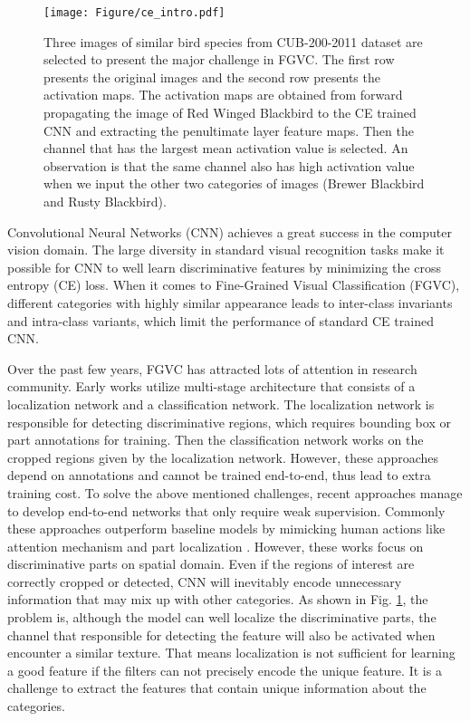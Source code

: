 \documentclass{article}
\theoremstyle{definition}
\begin{document}
\begin{figure}[tb]
    \centering
    \texttt{[image: Figure/ce\_intro.pdf]}
    \caption{Three images of similar bird species from CUB-200-2011 dataset are selected to present the major challenge in FGVC. The first row presents the original images and the second row presents the activation maps. The activation maps are obtained from forward propagating the image of Red Winged Blackbird to the CE trained CNN and extracting the penultimate layer feature maps. Then the channel that has the largest mean activation value is selected. An observation is that the same channel also has high activation value when we input the other two categories of images (Brewer Blackbird and Rusty Blackbird).}
    \label{fig:intro}
\end{figure}

Convolutional Neural Networks (CNN) achieves a great success in the computer vision domain. The large diversity in standard visual recognition tasks make it possible for CNN to well learn discriminative features by minimizing the cross entropy (CE) loss. When it comes to Fine-Grained Visual Classification (FGVC), different categories with highly similar appearance leads to inter-class invariants and intra-class variants, which limit the performance of standard CE trained CNN. 

Over the past few years, FGVC has attracted lots of attention in research community. Early works \cite{zhang2014part,bransonbird,wei2016mask} utilize multi-stage architecture that consists of a localization network and a classification network. The localization network is responsible for detecting discriminative regions, which requires bounding box or part annotations for training. Then the classification network works on the cropped regions given by the localization network. However, these approaches depend on annotations and cannot be trained end-to-end, thus lead to extra training cost. To solve the above mentioned challenges, recent approaches manage to develop end-to-end networks that only require weak supervision. Commonly these approaches outperform baseline models by mimicking human actions like attention mechanism and part localization \cite{zheng2017learning,fu2017look,sun2018multi,wang2018learning,chen2019destruction,ding2019selective,wang2020graph}. However, these works focus on discriminative parts on spatial domain. Even if the regions of interest are correctly cropped or detected, CNN will inevitably encode unnecessary information that may mix up with other categories. As shown in Fig. \ref{fig:intro}, the problem is, although the model can well localize the discriminative parts, the channel that responsible for detecting the feature will also be activated when encounter a similar texture. That means localization is not sufficient for learning a good feature if the filters can not precisely encode the unique feature. It is a challenge to extract the features that contain unique information about the categories.
\end{document}
